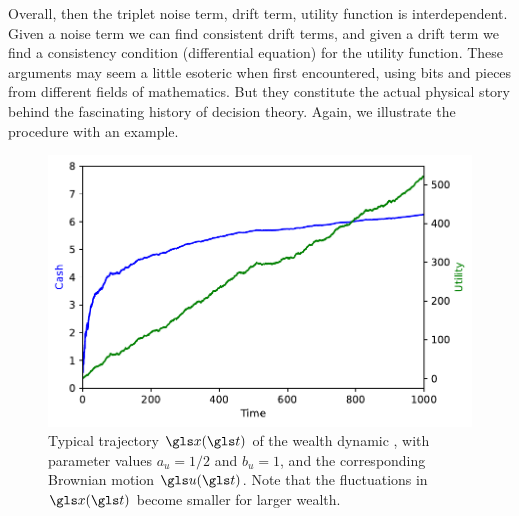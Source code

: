 Overall, then the triplet noise term, drift term, utility function is
interdependent. Given a noise term we can find consistent drift terms,
and given a drift term we find a consistency condition (differential
equation) for the utility function. These arguments may seem a little
esoteric when first encountered, using bits and pieces from different 
fields of mathematics. But they constitute the actual physical story behind the
fascinating history of decision theory. Again, we illustrate the procedure with an example.

\begin{figure}
\centering
\includegraphics[width=\textwidth]{./chapter_2/figs/trajectories.pdf}
\caption{\small Typical trajectory $\x(\t)$ of the wealth
dynamic , with parameter values $a_u=1/2$ and $b_u=1$,  and the corresponding Brownian motion $\gu(\t)$. Note that the fluctuations in $\x(\t)$ become smaller for larger wealth. }
\end{figure}

